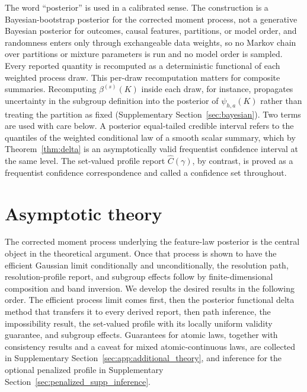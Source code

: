 \documentclass[11pt]{article}
\begin{document}
The word ``posterior'' is used in a calibrated sense. The construction is a Bayesian-bootstrap posterior for the corrected moment process, not a generative Bayesian posterior for outcomes, causal features, partitions, or model order, and randomness enters only through exchangeable data weights, so no Markov chain over partitions or mixture parameters is run and no model order is sampled. Every reported quantity is recomputed as a deterministic functional of each weighted process draw. This per-draw recomputation matters for composite summaries. Recomputing $\beta^{(s)}(K)$ inside each draw, for instance, propagates uncertainty in the subgroup definition into the posterior of $\psi_{h,a}(K)$ rather than treating the partition as fixed (Supplementary Section~\ref{sec:bayesian}).
Two terms are used with care below. A posterior equal-tailed credible interval refers to the quantiles of the weighted conditional law of a smooth scalar summary, which by Theorem~\ref{thm:delta} is an asymptotically valid frequentist confidence interval at the same level. The set-valued profile report $\widehat C(\gamma)$, by contrast, is proved as a frequentist confidence correspondence and called a confidence set throughout.




\section{Asymptotic theory}\label{sec:theory}

The corrected moment process underlying the feature-law posterior is the central object in the theoretical argument.  Once that process is shown to have the efficient Gaussian limit conditionally and unconditionally, the resolution path, resolution-profile report, and subgroup effects follow by finite-dimensional composition and band inversion.  We develop the desired results in the following order. The efficient process limit comes first, then the posterior functional delta method that transfers it to every derived report, then path inference, the impossibility result, the set-valued profile with its locally uniform validity guarantee, and subgroup effects.  Guarantees for atomic laws, together with consistency results and a caveat for mixed atomic-continuous laws, are collected in Supplementary Section~\ref{sec:app:additional_theory}, and inference for the optional penalized profile in Supplementary Section~\ref{sec:penalized_supp_inference}.
\end{document}
